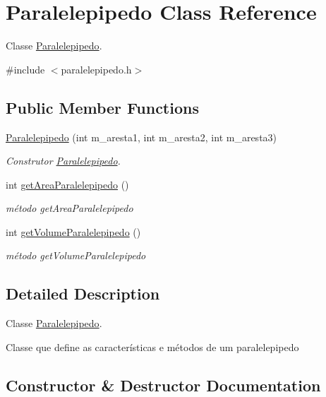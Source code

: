 \hypertarget{classParalelepipedo}{}\section{Paralelepipedo Class Reference}
\label{classParalelepipedo}


Classe \hyperlink{classParalelepipedo}{Paralelepipedo}.  




{\ttfamily \#include $<$paralelepipedo.\+h$>$}

\subsection*{Public Member Functions}
\begin{DoxyCompactItemize}
\item 
\hyperlink{classParalelepipedo_acedd6f0d33c4786c64a3e34be37c645b}{Paralelepipedo} (int m\+\_\+aresta1, int m\+\_\+aresta2, int m\+\_\+aresta3)
\begin{DoxyCompactList}\small\item\em Construtor \hyperlink{classParalelepipedo}{Paralelepipedo}. \end{DoxyCompactList}\item 
int \hyperlink{classParalelepipedo_addbf5f2ab3cf05c45a174f6fcdb861ed}{get\+Area\+Paralelepipedo} ()
\begin{DoxyCompactList}\small\item\em método get\+Area\+Paralelepipedo \end{DoxyCompactList}\item 
int \hyperlink{classParalelepipedo_a869928dde4f5f829930c66898620021c}{get\+Volume\+Paralelepipedo} ()
\begin{DoxyCompactList}\small\item\em método get\+Volume\+Paralelepipedo \end{DoxyCompactList}\end{DoxyCompactItemize}


\subsection{Detailed Description}
Classe \hyperlink{classParalelepipedo}{Paralelepipedo}. 

Classe que define as características e métodos de um paralelepipedo 

\subsection{Constructor \& Destructor Documentation}
